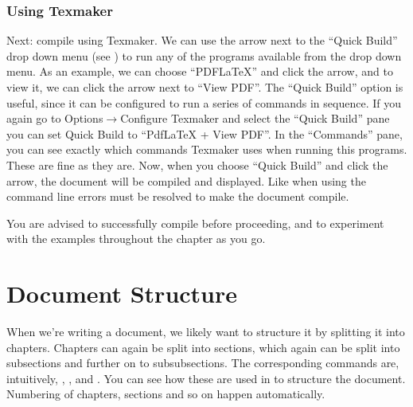 \subsubsection{Using Texmaker}
Next: compile using Texmaker. We can use the arrow next to the ``Quick Build'' drop down menu (see ) to run any of the programs available from the drop down menu. As an example, we can choose ``PDFLaTeX'' and click the arrow, and to view it, we can click the arrow next to ``View PDF''. The ``Quick Build'' option is useful, since it can be configured to run a series of commands in sequence. If you again go to Options$\rightarrow$Configure Texmaker and select the ``Quick Build'' pane you can set Quick Build to ``PdfLaTeX + View PDF''. In the ``Commands'' pane, you can see exactly which commands Texmaker uses when running this programs. These are fine as they are. Now, when you choose ``Quick Build'' and click the arrow, the document will be compiled and displayed. Like when using the command line errors must be resolved to make the document compile.

You are advised to successfully compile  before proceeding, and to experiment with the examples throughout the chapter as you go.

\section{Document Structure}
When we're writing a document, we likely want to structure it by splitting it into chapters. Chapters can again be split into sections, which again can be split into subsections and further on to subsubsections. The corresponding commands are, intuitively, \latexin{\chapter}, \latexin{\section}, \latexin{\subsection} and \latexin{\subsubsection}. You can see how these are used in  to structure the document. Numbering of chapters, sections and so on happen automatically.

